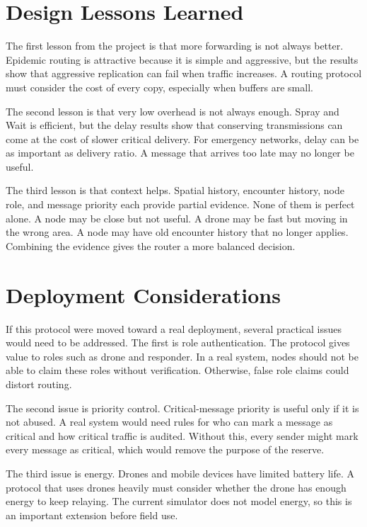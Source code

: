 \section{Design Lessons Learned}
The first lesson from the project is that more forwarding is not always better. Epidemic routing is attractive because it is simple and aggressive, but the results show that aggressive replication can fail when traffic increases. A routing protocol must consider the cost of every copy, especially when buffers are small.

The second lesson is that very low overhead is not always enough. Spray and Wait is efficient, but the delay results show that conserving transmissions can come at the cost of slower critical delivery. For emergency networks, delay can be as important as delivery ratio. A message that arrives too late may no longer be useful.

The third lesson is that context helps. Spatial history, encounter history, node role, and message priority each provide partial evidence. None of them is perfect alone. A node may be close but not useful. A drone may be fast but moving in the wrong area. A node may have old encounter history that no longer applies. Combining the evidence gives the router a more balanced decision.

\section{Deployment Considerations}
If this protocol were moved toward a real deployment, several practical issues would need to be addressed. The first is role authentication. The protocol gives value to roles such as drone and responder. In a real system, nodes should not be able to claim these roles without verification. Otherwise, false role claims could distort routing.

The second issue is priority control. Critical-message priority is useful only if it is not abused. A real system would need rules for who can mark a message as critical and how critical traffic is audited. Without this, every sender might mark every message as critical, which would remove the purpose of the reserve.

The third issue is energy. Drones and mobile devices have limited battery life. A protocol that uses drones heavily must consider whether the drone has enough energy to keep relaying. The current simulator does not model energy, so this is an important extension before field use.

